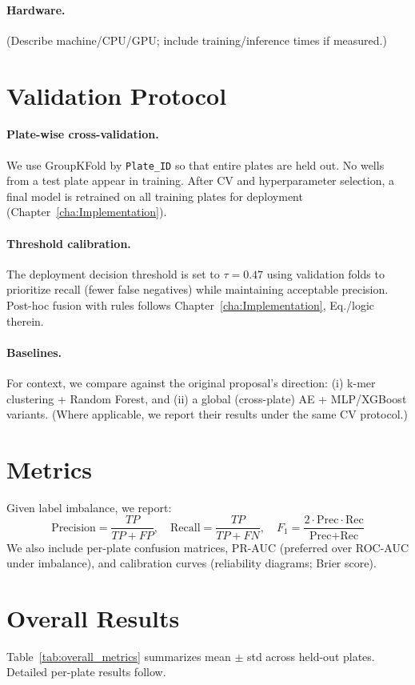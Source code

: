 \paragraph{Hardware.}
(Describe machine/CPU/GPU; include training/inference times if measured.)

\section{Validation Protocol}
\label{sec:protocol}
\paragraph{Plate-wise cross-validation.}
We use GroupKFold by \texttt{Plate\_ID} so that entire plates are held out. No wells from a test plate appear in training. After CV and hyperparameter selection, a final model is retrained on all training plates for deployment (Chapter~\ref{cha:Implementation}).

\paragraph{Threshold calibration.}
The deployment decision threshold is set to $\tau = 0.47$ using validation folds to prioritize recall (fewer false negatives) while maintaining acceptable precision. Post-hoc fusion with rules follows Chapter~\ref{cha:Implementation}, Eq./logic therein.

\paragraph{Baselines.}
For context, we compare against the original proposal’s direction:
(i) k-mer clustering + Random Forest, and
(ii) a global (cross-plate) AE + MLP/XGBoost variants.
(Where applicable, we report their results under the same CV protocol.)

\section{Metrics}
\label{sec:metrics}
Given label imbalance, we report:
\[
\text{Precision}=\frac{TP}{TP+FP},\quad
\text{Recall}=\frac{TP}{TP+FN},\quad
F_1=\frac{2\cdot \text{Prec}\cdot \text{Rec}}{\text{Prec}+\text{Rec}}
\]
We also include per-plate confusion matrices, PR-AUC (preferred over ROC-AUC under imbalance), and calibration curves (reliability diagrams; Brier score).

\section{Overall Results}
\label{sec:overall_results}
Table~\ref{tab:overall_metrics} summarizes mean $\pm$ std across held-out plates. Detailed per-plate results follow.

